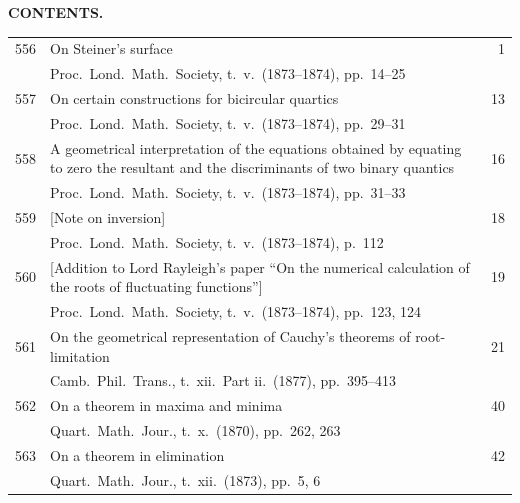 \documentclass[12pt,a4paper]{article}
\theoremstyle{plain}
\theoremstyle{definition}
\begin{document}

\newpage
\setcounter{page}{7}

\begin{center}
{\large \textbf{CONTENTS.}}
\end{center}

\vspace{12pt}

\noindent
\begin{longtable}{r @{. } p{4.8in} r}
556 & On Steiner's surface & 1 \\
  & Proc.\ Lond.\ Math.\ Society, t.\ v.\ (1873--1874), pp.\ 14--25 & \\ 

557 & On certain constructions for bicircular quartics & 13 \\
  & Proc.\ Lond.\ Math.\ Society, t.\ v.\ (1873--1874), pp.\ 29--31 & \\ 

558 & A geometrical interpretation of the equations obtained by equating to zero the resultant and the discriminants of two binary quantics & 16 \\
  & Proc.\ Lond.\ Math.\ Society, t.\ v.\ (1873--1874), pp.\ 31--33 & \\ 

559 & [Note on inversion] & 18 \\
  & Proc.\ Lond.\ Math.\ Society, t.\ v.\ (1873--1874), p.\ 112 & \\ 

560 & [Addition to Lord Rayleigh's paper ``On the numerical calculation of the roots of fluctuating functions''] & 19 \\
  & Proc.\ Lond.\ Math.\ Society, t.\ v.\ (1873--1874), pp.\ 123, 124 & \\ 

561 & On the geometrical representation of Cauchy's theorems of root-limitation & 21 \\
  & Camb.\ Phil.\ Trans., t.\ xii.\ Part ii.\ (1877), pp.\ 395--413 & \\ 

562 & On a theorem in maxima and minima & 40 \\
  & Quart.\ Math.\ Jour., t.\ x.\ (1870), pp.\ 262, 263 & \\ 

563 & On a theorem in elimination & 42 \\
  & Quart.\ Math.\ Jour., t.\ xii.\ (1873), pp.\ 5, 6 & \\ 


\end{longtable}
\end{document}
